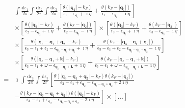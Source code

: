 \[ \begin{split} &\int \frac{\mathrm{d}\epsilon_1}{2\pi} \int \frac{\mathrm{d}\epsilon_2}{2\pi} \int \frac{\mathrm{d}\epsilon_3}{2\pi}\left[ \frac{\theta(|\mathbf{q}_1|-k_F)}{\epsilon_1-\epsilon_{\mathbf{q}_1}+\imath \eta} + \frac{\theta(k_F-|\mathbf{q}_1|)}{\epsilon_1-\epsilon_{\mathbf{q}_1}-\imath \eta} \right] \\
& \times \left[ \frac{\theta(|\mathbf{q}_2|-k_F)}{\epsilon_2-\epsilon_{\mathbf{q}_2}+\imath \eta} + \frac{\theta(k_F-|\mathbf{q}_2|)}{\epsilon_2-\epsilon_{\mathbf{q}_2}-\imath \eta} \right] \times \left[ \frac{\theta(|\mathbf{q}_3|-k_F)}{\epsilon_3-\epsilon_{\mathbf{q}_3}+\imath \eta} + \frac{\theta(k_F-|\mathbf{q}_3|)}{\epsilon_3-\epsilon_{\mathbf{q}_3}-\imath \eta} \right] \\
& \times \left[ \frac{\theta(|\mathbf{q}_3-\mathbf{q}_1+\mathbf{q}_2|-k_F)}{\epsilon_3-\epsilon_1+\epsilon_2-\epsilon_{\mathbf{q}_3-\mathbf{q}_1+\mathbf{q}_2}+\imath \eta} + \frac{\theta(k_F-|\mathbf{q}_3-\mathbf{q}_1+\mathbf{q}_2|)}{\epsilon_3-\epsilon_1+\epsilon_2-\epsilon_{\mathbf{q}_3-\mathbf{q}_1+\mathbf{q}_2}-\imath \eta} \right]\\
& \times \left[ \frac{\theta(|\mathbf{q}_3-\mathbf{q}_1+\mathbf{k}|-k_F)}{\epsilon_3-\epsilon_1+\omega-\epsilon_{\mathbf{q}_3-\mathbf{q}_1+\mathbf{k}}+\imath \eta} + \frac{\theta(k_F-|\mathbf{q}_3-\mathbf{q}_1+\mathbf{k}|)}{\epsilon_3-\epsilon_1+\omega-\epsilon_{\mathbf{q}_3-\mathbf{q}_1+\mathbf{k}}-\imath \eta} \right]\\
=& \imath \int \frac{\mathrm{d}\epsilon_1}{2\pi} \int \frac{\mathrm{d}\epsilon_3}{2\pi} \left[ \frac{\theta(|\mathbf{q}_3-\mathbf{q}_1+\mathbf{q}_2|-k_F)\theta(k_F-|\mathbf{q}_2|)}{\epsilon_3-\epsilon_1+\epsilon_{\mathbf{q}_2}-\epsilon_{\mathbf{q}_3-\mathbf{q}_1+\mathbf{q}_2}+2\imath \eta} \right. \\
& \left. - \frac{\theta(k_F-|\mathbf{q}_3-\mathbf{q}_1+\mathbf{q}_2|)\theta(|\mathbf{q}_2|-k_F)}{\epsilon_3-\epsilon_1+\epsilon_{\mathbf{q}_2}-\epsilon_{\mathbf{q}_3-\mathbf{q}_1+\mathbf{q}_2}-2\imath \eta} \right] \times \left[ \ldots \right]
\end{split} \]
